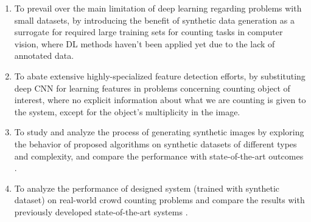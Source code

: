 \begin{enumerate}

\item To prevail over the main limitation of deep learning regarding problems with small datasets, by introducing the benefit of synthetic data generation as a surrogate for required large training sets  for counting tasks in computer vision, where DL methods haven't been applied yet due to the lack of annotated data.

\item To abate extensive highly-specialized feature detection efforts, by substituting deep CNN for learning features in problems concerning counting object of interest, where no explicit information about what we are counting is given to the system, except for the object's multiplicity in the image.


\item To study and analyze the process of generating synthetic images by exploring the behavior of proposed algorithms on synthetic datasets of different types and complexity, and compare the performance with state-of-the-art outcomes \cite{segui2015learning}. 


\item To analyze the performance of designed system (trained with synthetic dataset) on real-world crowd counting problems and compare the results with previously developed state-of-the-art systems \cite{chan2008privacy}.   
 

\end{enumerate}

